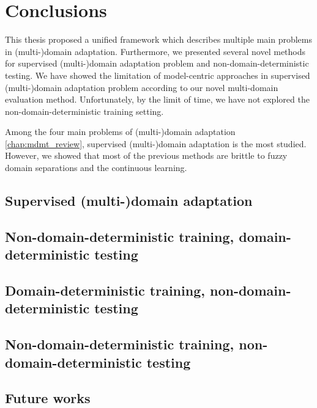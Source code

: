 \chapter{Conclusions}
\label{chap:conclusion}
This thesis proposed a unified framework which describes multiple main problems in (multi-)domain adaptation. Furthermore, we presented several novel methods for supervised (multi-)domain adaptation problem and non-domain-deterministic testing. We have showed the limitation of model-centric approaches in 
supervised (multi-)domain adaptation problem according to our novel multi-domain evaluation method. Unfortunately, by the limit of time, we have not explored the non-domain-deterministic training setting.

Among the four main problems of (multi-)domain adaptation \ref{chap:mdmt_review}, supervised (multi-)domain adaptation is the most studied. However, we showed that most of the previous methods are brittle to fuzzy domain separations and the continuous learning.  

\section{Supervised (multi-)domain adaptation}

\section{Non-domain-deterministic training, domain-deterministic testing}

\section{Domain-deterministic training, non-domain-deterministic testing}

\section{Non-domain-deterministic training, non-domain-deterministic testing}

\section{Future works}
